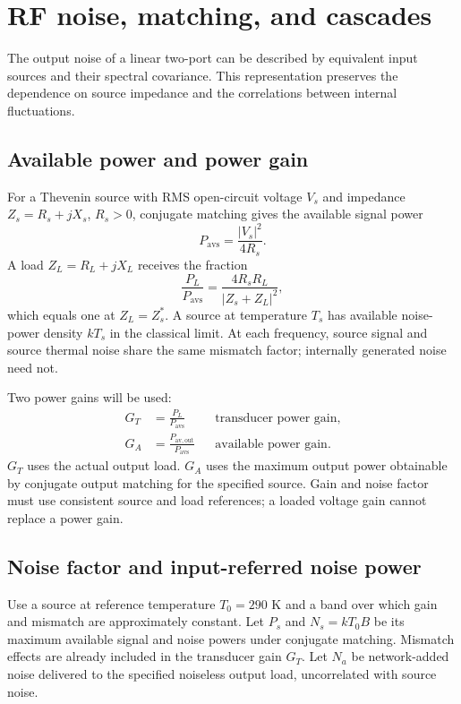 
\clearpage
\section{RF noise, matching, and cascades}
\label{sec:rf}
The output noise of a linear two-port can be described by equivalent input sources and their spectral covariance. This representation preserves the dependence on source impedance and the correlations between internal fluctuations.

\subsection{Available power and power gain}
For a Thevenin source with RMS open-circuit voltage $V_s$ and impedance $Z_s=R_s+jX_s$, $R_s>0$, conjugate matching gives the available signal power
\[
P_{\mathrm{avs}}=\frac{|V_s|^2}{4R_s}.
\]
A load $Z_L=R_L+jX_L$ receives the fraction
\[
\frac{P_L}{P_{\mathrm{avs}}}=\frac{4R_sR_L}{|Z_s+Z_L|^2},
\]
which equals one at $Z_L=Z_s^*$. A source at temperature $T_s$ has available noise-power density $kT_s$ in the classical limit. At each frequency, source signal and source thermal noise share the same mismatch factor; internally generated noise need not.

Two power gains will be used:
\begin{align*}
G_T&=\frac{P_L}{P_{\mathrm{avs}}} &&\text{transducer power gain},\\
G_A&=\frac{P_{\mathrm{av,out}}}{P_{\mathrm{avs}}} &&\text{available power gain}.
\end{align*}
$G_T$ uses the actual output load. $G_A$ uses the maximum output power obtainable by conjugate output matching for the specified source. Gain and noise factor must use consistent source and load references; a loaded voltage gain cannot replace a power gain.

\subsection{Noise factor and input-referred noise power}
\label{sec:noise-factor}
Use a source at reference temperature $T_0=290$ K and a band over which gain and mismatch are approximately constant. Let $P_s$ and $N_s=kT_0B$ be its maximum available signal and noise powers under conjugate matching. Mismatch effects are already included in the transducer gain $G_T$. Let $N_a$ be network-added noise delivered to the specified noiseless output load, uncorrelated with source noise.

